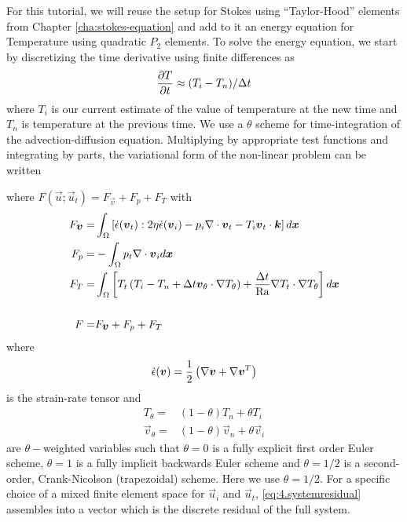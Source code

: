 For this tutorial, we will reuse the setup for  Stokes using
``Taylor-Hood'' elements from 
Chapter \ref{cha:stokes-equation} and add to it an energy equation for
Temperature using quadratic $P_{2}$ elements. To solve the energy
equation, we start by discretizing the time derivative
using finite differences as
\begin{displaymath}
  \frac{\partial T}{\partial t}\approx(T_{i} - T_{n})/\Delta t
\end{displaymath}
where $T_{i}$ is our current estimate of the value of temperature at the new
time and $T_{n}$ is temperature at the previous time. We use a
$\theta$ scheme  for time-integration of the advection-diffusion
equation.  Multiplying by appropriate test functions and integrating by parts, the
variational form of the non-linear problem can be written
\begin{quote}
\end{quote}
 where $F(\vec{u};\vec{u}_{t}) = F_{\vec{v}} + F_{p} + F_{T}$ with
\begin{align}
         F_{{\mbox{\boldmath$v$}}} =  & \int_\Omega \left[\dot{\epsilon}({\mbox{\boldmath$v$}}_{t}):
             2\eta \dot{\epsilon}({\mbox{\boldmath$v$}}_{i}) -
             p_{i}\nabla\cdot{\mbox{\boldmath$v$}}_t  - T_{i}{\mbox{\boldmath$v$}}_{t} \cdot{\mbox{\boldmath$k$}} \right]d{\mbox{\boldmath$x$}}  \\
 F_{p} =& -\int_\Omega p_t\nabla\cdot{\mbox{\boldmath$v$}}_{i} d{\mbox{\boldmath$x$}}\\
F_{T}  = &\int_\Omega \left[ T_t\left(T_{i} - T_{n} + \Delta t{\mbox{\boldmath$v$}}_{\theta}\cdot\nabla T_{\theta}\right) +\frac{\Delta t}{\mathrm{Ra}}\nabla
T_t \cdot\nabla T_\theta \right]d{\mbox{\boldmath$x$}} \label{eq:4.26}\\
\nonumber \\
  F = & F_{{\mbox{\boldmath$v$}}} + F_{p} + F_{T} \label{eq:4.systemresidual}
\end{align}
where \begin{equation}
  \label{eq:4.19}
  \dot{\epsilon}({\mbox{\boldmath$v$}}) = \frac{1}{2}
  \left(
\nabla{\mbox{\boldmath$v$}} + \nabla{\mbox{\boldmath$v$}}^{T}
  \right)
\end{equation} is the strain-rate tensor and 
\begin{align*}
  T_{\theta} = & (1-\theta)T_{n} + \theta T_{i}\\
  \vec{v}_{\theta} = & (1-\theta)\vec{v}_{n} + \theta \vec{v}_{i}
\end{align*}
are $\theta-$weighted variables such that $\theta=0$ is a fully
explicit first order Euler scheme, $\theta = 1$ is a fully implicit
backwards Euler scheme and $\theta = 1/2$ is a second-order,
Crank-Nicolson (trapezoidal) scheme.  Here we use $\theta=1/2$.
For a specific choice of a mixed finite element space for $\vec{u}_{i}$ and
$\vec{u}_{t}$, \eqref{eq:4.systemresidual} assembles into a vector which is the
discrete residual of the full system. 

